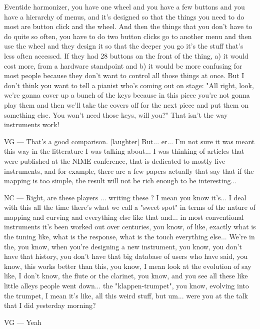 Eventide harmonizer, you have one wheel and you have a few buttons and you have a hierarchy of menus, and it's designed so that the things you need to do most are button click and the wheel. And then the things that you don't have to do quite so often, you have to do two button clicks go to another menu and then use the wheel and they design it so that the deeper you go it's the stuff that's less often accessed. If they had 28 buttons on the front of the thing, a) it would cost more, from a hardware standpoint and b) it would be more confusing for most people because they don't want to control all those things at once. But I don't think you want to tell a pianist who's coming out on stage: "All right, look, we're gonna cover up a bunch of the keys because in this piece you're not gonna play them and then we'll take the covers off for the next piece and put them on something else. You won't need those keys, will you?" That isn't the way instruments work! 

VG — That's a good comparison. [laughter] But... er... I'm not sure it was meant this way in the litterature I was talking about... I was thinking of articles that were published at the NIME conference, that is dedicated to mostly live instruments, and for example, there are a few papers actually that say that if the mapping is too simple, the result will not be rich enough to be interesting... 

NC — Right, are these players ... writing these ? I mean you know it's... I deal with this all the time there's what we call a "sweet spot" in terms of the nature of mapping and curving and everything else like that and... in most conventional instruments it's been worked out over centuries, you know, of like, exactly what is the tuning like, what is the response, what is the touch everything else... We're in the, you know, when you're designing a new instrument, you know, you don't have that history, you don't have that big database of users who have said, you know, this works better than this, you know, I mean look at the evolution of say like, I don't know, the flute or the clarinet, you know, and you see all these like little alleys people went down... the "klappen-trumpet", you know, evolving into the trumpet, I mean it's like, all this weird stuff, but um... were you at the talk that I did yesterday morning? 

VG — Yeah 

